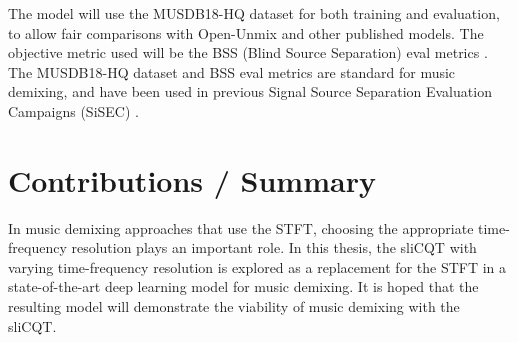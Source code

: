 \documentclass[letter,12pt]{article}
\begin{document}
The model will use the MUSDB18-HQ dataset \parencite{musdb18hq} for both training and evaluation, to allow fair comparisons with Open-Unmix and other published models. The objective metric used will be the BSS (Blind Source Separation) eval metrics \parencite{bss}. The MUSDB18-HQ dataset and BSS eval metrics are standard for music demixing, and have been used in previous Signal Source Separation Evaluation Campaigns (SiSEC) \parencite{sisec2018}.

\section{Contributions / Summary}

In music demixing approaches that use the STFT, choosing the appropriate time-frequency resolution plays an important role. In this thesis, the sliCQT with varying time-frequency resolution is explored as a replacement for the STFT in a state-of-the-art deep learning model for music demixing. It is hoped that the resulting model will demonstrate the viability of music demixing with the sliCQT.

\vfill
\clearpage %


\begingroup
{}
\setlength\bibitemsep{0.05em}
\printbibheading[title={References},heading=bibnumbered]
\printbibliography[heading=none]
\endgroup

\vfill
\clearpage %
\end{document}
